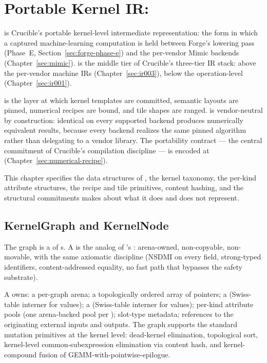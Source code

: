 
\section{Portable Kernel IR: }
\label{sec:ir002}

 is Crucible's portable kernel-level intermediate representation: the form in which a captured machine-learning computation is held between Forge's lowering pass (Phase~E, Section~\ref{sec:forge-phase-e}) and the per-vendor Mimic backends (Chapter~\ref{sec:mimic}).
 is the middle tier of Crucible's three-tier IR stack: above the per-vendor machine IRs  (Chapter~\ref{sec:ir003}), below the operation-level  (Chapter~\ref{sec:ir001}).

 is the layer at which kernel templates are committed, semantic layouts are pinned, numerical recipes are bound, and tile shapes are ranged.
 is vendor-neutral by construction: identical  on every supported backend produces numerically equivalent results, because every backend realizes the same pinned algorithm rather than delegating to a vendor library.
The portability contract --- the central commitment of Crucible's compilation discipline --- is encoded at  (Chapter~\ref{sec:numerical-recipe}).

This chapter specifies the data structures of , the kernel taxonomy, the per-kind attribute structures, the recipe and tile primitives, content hashing, and the structural commitments  makes about what it does and does not represent.

\subsection{KernelGraph and KernelNode}
\label{sec:ir002-kernelgraph}

The  graph is a  of s.
A  is the  analog of 's : arena-owned, non-copyable, non-movable, with the same axiomatic discipline (NSDMI on every field, strong-typed identifiers, content-addressed equality, no fast path that bypasses the safety substrate).

\begin{definition}[KernelGraph]
\label{def:ir002-kernelgraph}
A  owns: a per-graph arena; a topologically ordered array of  pointers; a  (Swiss-table interner for  values); a  (Swiss-table interner for  values); per-kind attribute pools (one arena-backed pool per ); slot-type metadata; references to the originating  external inputs and outputs.
The graph supports the standard mutation primitives at the kernel level: dead-kernel elimination, topological sort, kernel-level common-subexpression elimination via content hash, and kernel-compound fusion of GEMM-with-pointwise-epilogue.
\end{definition}

